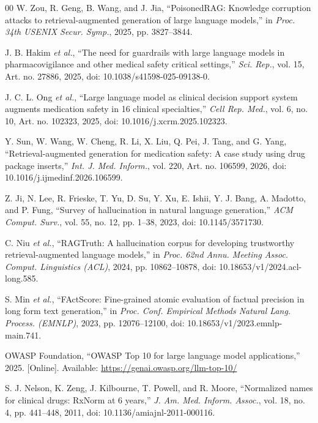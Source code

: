 \documentclass[conference]{IEEEtran}
\begin{document}
\begin{thebibliography}{00}
W. Zou, R. Geng, B. Wang, and J. Jia, ``PoisonedRAG: Knowledge corruption attacks to retrieval-augmented generation of
large language models,'' in \emph{Proc. 34th USENIX Secur. Symp.}, 2025, pp. 3827--3844.

J. B. Hakim \emph{et al.}, ``The need for guardrails with large language models in pharmacovigilance and other medical
safety critical settings,'' \emph{Sci. Rep.}, vol. 15, Art. no. 27886, 2025, doi: 10.1038/s41598-025-09138-0.

J. C. L. Ong \emph{et al.}, ``Large language model as clinical decision support system augments medication safety in 16
clinical specialties,'' \emph{Cell Rep. Med.}, vol. 6, no. 10, Art. no. 102323, 2025, doi: 10.1016/j.xcrm.2025.102323.

Y. Sun, W. Wang, W. Cheng, R. Li, X. Liu, Q. Pei, J. Tang, and G. Yang, ``Retrieval-augmented generation for medication
safety: A case study using drug package inserts,'' \emph{Int. J. Med. Inform.}, vol. 220, Art. no. 106599, 2026,
doi: 10.1016/j.ijmedinf.2026.106599.

Z. Ji, N. Lee, R. Frieske, T. Yu, D. Su, Y. Xu, E. Ishii, Y. J. Bang, A. Madotto, and P. Fung, ``Survey of hallucination
in natural language generation,'' \emph{ACM Comput. Surv.}, vol. 55, no. 12, pp. 1--38, 2023, doi: 10.1145/3571730.

C. Niu \emph{et al.}, ``RAGTruth: A hallucination corpus for developing trustworthy retrieval-augmented language
models,'' in \emph{Proc. 62nd Annu. Meeting Assoc. Comput. Linguistics (ACL)}, 2024, pp. 10862--10878,
doi: 10.18653/v1/2024.acl-long.585.

S. Min \emph{et al.}, ``FActScore: Fine-grained atomic evaluation of factual precision in long form text generation,''
in \emph{Proc. Conf. Empirical Methods Natural Lang. Process. (EMNLP)}, 2023, pp. 12076--12100,
doi: 10.18653/v1/2023.emnlp-main.741.

OWASP Foundation, ``OWASP Top 10 for large language model applications,'' 2025. [Online]. Available:
\url{https://genai.owasp.org/llm-top-10/}

S. J. Nelson, K. Zeng, J. Kilbourne, T. Powell, and R. Moore, ``Normalized names for clinical drugs: RxNorm at 6
years,'' \emph{J. Am. Med. Inform. Assoc.}, vol. 18, no. 4, pp. 441--448, 2011, doi: 10.1136/amiajnl-2011-000116.


\end{thebibliography}
\end{document}
